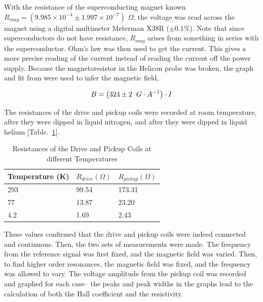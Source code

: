 With the resistance of the superconducting magnet known $R_{mag} = (9.985 \times 10^{-4}\pm 1.997 \times 10^{-7})$ $\Omega$, the voltage was read across the magnet using a digital multimeter Meterman X38R ($\pm 0.1\%$). Note that since superconductors do not have resistance, $R_{mag}$ arises from something in series with the superconductor. Ohm's law was then used to get the current. This gives a more precise reading of the current instead of reading the current off the power supply. Because the magnetoresistor in the Helicon probe was broken, the graph and fit from \cite{c1} were used to infer the magnetic field, 

\begin{align} \label{eq:magfit}
B = \left(324 \pm 2 \hspace{2mm} G\cdot A^{-1} \right) \cdot I
\end{align}

The resistances of the drive and pickup coils were recorded at room temperature, after they were dipped in liquid nitrogen, and after they were dipped in liquid helium [Table.~\ref{table:1}].   

\begin{table}[H]
\caption{Resistances of the Drive and Pickup Coils at different Temperatures}
\centering
\begin{tabular}{l l l}
\hline %
\hline
Temperature (K) & $R_{drive} (\Omega)$ & $R_{pick up} (\Omega)$ \\ \hline
\hspace{8mm} 293 & \hspace{2mm} 99.54 & \hspace{2mm} 173.31  \\ 
\hspace{8.5mm} 77 & \hspace{2mm} 13.87 & \hspace{2.5mm} 23.20 \\ 
\hspace{8mm} 4.2 & \hspace{2.5mm} 1.69 & \hspace{3mm} 2.43 \\ 
\hline \hline
\end{tabular}
\label{table:1}
\end{table}

These values confirmed that the drive and pickup coils were indeed connected and continuous. Then, the two sets of measurements were made. The frequency from the reference signal was first fixed, and the magnetic field was varied. Then, to find higher order resonances, the magnetic field was fixed, and the frequency was allowed to vary. The voltage amplitude from the pickup coil was recorded and graphed for each case-- the peaks and peak widths in the graphs lead to the calculation of both the Hall coefficient and the resistivity. 
\newpage

